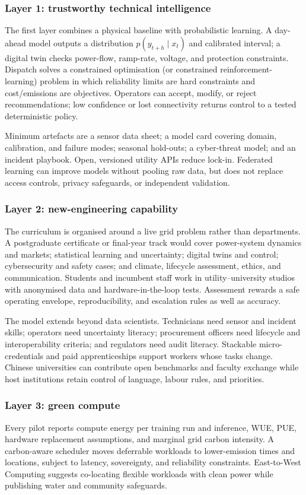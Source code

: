 \documentclass[12pt]{article}
\begin{document}
\subsubsection{Layer 1: trustworthy technical intelligence}
The first layer combines a physical baseline with probabilistic learning. A day-ahead model outputs a distribution $p(y_{t+h}\mid x_t)$ and calibrated interval; a digital twin checks power-flow, ramp-rate, voltage, and protection constraints. Dispatch solves a constrained optimisation (or constrained reinforcement-learning) problem in which reliability limits are hard constraints and cost/emissions are objectives. Operators can accept, modify, or reject recommendations; low confidence or lost connectivity returns control to a tested deterministic policy.

Minimum artefacts are a sensor data sheet; a model card covering domain, calibration, and failure modes; seasonal hold-outs; a cyber-threat model; and an incident playbook. Open, versioned utility APIs reduce lock-in. Federated learning can improve models without pooling raw data, but does not replace access controls, privacy safeguards, or independent validation.

\subsubsection{Layer 2: new-engineering capability}
The curriculum is organised around a live grid problem rather than departments. A postgraduate certificate or final-year track would cover power-system dynamics and markets; statistical learning and uncertainty; digital twins and control; cybersecurity and safety cases; and climate, lifecycle assessment, ethics, and communication. Students and incumbent staff work in utility--university studios with anonymised data and hardware-in-the-loop tests. Assessment rewards a safe operating envelope, reproducibility, and escalation rules as well as accuracy.

The model extends beyond data scientists. Technicians need sensor and incident skills; operators need uncertainty literacy; procurement officers need lifecycle and interoperability criteria; and regulators need audit literacy. Stackable micro-credentials and paid apprenticeships support workers whose tasks change. Chinese universities can contribute open benchmarks and faculty exchange while host institutions retain control of language, labour rules, and priorities.

\subsubsection{Layer 3: green compute}
Every pilot reports compute energy per training run and inference, WUE, PUE, hardware replacement assumptions, and marginal grid carbon intensity. A carbon-aware scheduler moves deferrable workloads to lower-emission times and locations, subject to latency, sovereignty, and reliability constraints. East-to-West Computing suggests co-locating flexible workloads with clean power while publishing water and community safeguards.
\end{document}
